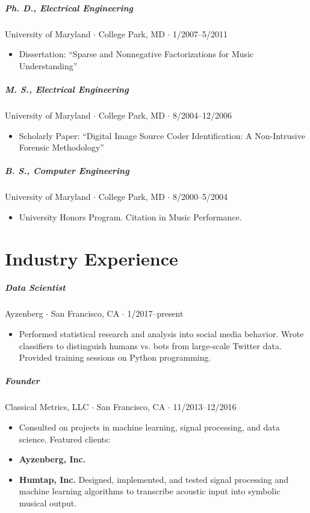 \documentclass[10pt,letterpaper]{article}
\begin{document}
\subparagraph{Ph. D., Electrical Engineering}
University of Maryland $\cdot$ College Park, MD $\cdot$ 1/2007--5/2011
\begin{itemize}
    \item Dissertation: ``Sparse and Nonnegative Factorizations for Music Understanding''
\end{itemize}

\subparagraph{M. S., Electrical Engineering}
University of Maryland $\cdot$ College Park, MD $\cdot$ 8/2004--12/2006
\begin{itemize}
    \item Scholarly Paper: ``Digital Image Source Coder Identification: A Non-Intrusive Forensic Methodology''
\end{itemize}

\subparagraph{B. S., Computer Engineering}
University of Maryland $\cdot$ College Park, MD $\cdot$ 8/2000--5/2004
\begin{itemize}
    \item University Honors Program.  Citation in Music Performance.
\end{itemize}


\section*{Industry Experience}

\subparagraph{Data Scientist}
Ayzenberg $\cdot$ San Francisco, CA $\cdot$ 1/2017--present
\begin{itemize}
    \item Performed statistical research and analysis into social media behavior. Wrote classifiers to distinguish humans vs. bots from large-scale Twitter data. Provided training sessions on Python programming.
\end{itemize}


\subparagraph{Founder}
Classical Metrics, LLC $\cdot$ San Francisco, CA $\cdot$ 11/2013--12/2016
\begin{itemize}
    \item Consulted on projects in machine learning, signal processing, and data science. Featured clients:
    \item \textbf{Ayzenberg, Inc.} 
    \item \textbf{Humtap, Inc.} Designed, implemented, and tested signal processing and machine learning algorithms to transcribe acoustic input into symbolic musical output.
\end{itemize}
\end{document}
